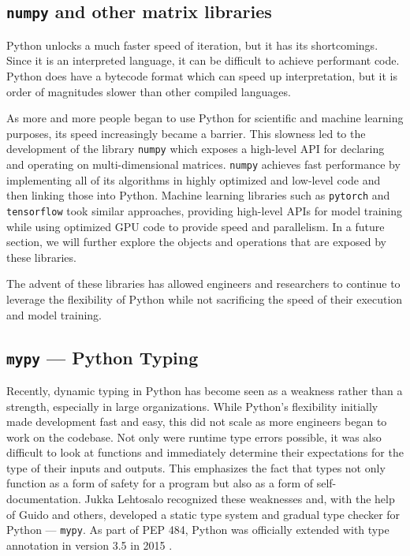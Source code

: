 \documentclass{report}
\begin{document}
\subsection{\texttt{numpy} and other matrix libraries}

Python unlocks a much faster speed of iteration, but it has its shortcomings. Since it is an interpreted language, it can be difficult to achieve performant code. Python does have a bytecode format which can speed up interpretation, but it is order of magnitudes slower than other compiled languages.

As more and more people began to use Python for scientific and machine learning purposes, its speed increasingly became a barrier. This slowness led to the development of the library \texttt{numpy} which exposes a high-level API for declaring and operating on multi-dimensional matrices. \texttt{numpy} achieves fast performance by implementing all of its algorithms in highly optimized and low-level code and then linking those into Python. Machine learning libraries such as \texttt{pytorch} and \texttt{tensorflow} took similar approaches, providing high-level APIs for model training while using optimized GPU code to provide speed and parallelism. In a future section, we will further explore the objects and operations that are exposed by these libraries.

The advent of these libraries has allowed engineers and researchers to continue to leverage the flexibility of Python while not sacrificing the speed of their execution and model training.

\subsection{\texttt{mypy} --- Python Typing}

Recently, dynamic typing in Python has become seen as a weakness rather than a strength, especially in large organizations. While Python's flexibility initially made development fast and easy, this did not scale as more engineers began to work on the codebase. Not only were runtime type errors possible, it was also difficult to look at functions and immediately determine their expectations for the type of their inputs and outputs. This emphasizes the fact that types not only function as a form of safety for a program but also as a form of self-documentation. Jukka Lehtosalo recognized these weaknesses and, with the help of Guido and others, developed a static type system and gradual type checker for Python --- \texttt{mypy}. As part of PEP 484, Python was officially extended with type annotation in version 3.5 in 2015 \cite{pep484}.
\end{document}

